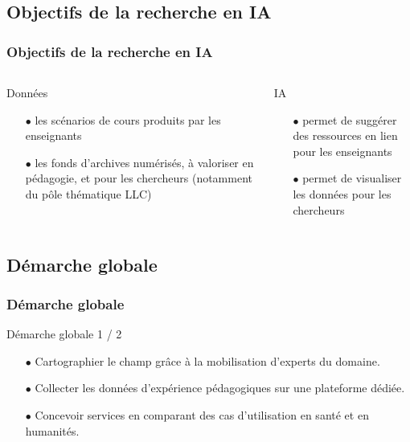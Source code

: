 \documentclass[xcolor=dvipsnames]{beamer}
\begin{document}
\subsection{Objectifs de la recherche en IA
}
\begin{frame}[fragile]
\frametitle{Objectifs de la recherche en IA
}
\begin{columns}
	\begin{block}{Données}
		\begin{itemize}
			\item[$\bullet$] les scénarios de cours produits par les enseignants
			\item[$\bullet$] les fonds d’archives numérisés, à valoriser en pédagogie, et pour les chercheurs (notamment du pôle thématique LLC)
		\end{itemize}	
	\end{block}
	\begin{block}{IA}
		\begin{itemize}
		\item[$\bullet$] permet de suggérer des ressources en lien pour les enseignants
		\item[$\bullet$] permet de visualiser les données pour les chercheurs
		\end{itemize}
	\end{block}
\end{columns}
\end{frame}

\subsection{Démarche globale}
\begin{frame}[fragile]
\frametitle{Démarche globale
}
\begin{block}{Démarche globale 1 / 2}
	\begin{itemize}
		\item[$\bullet$] Cartographier le champ grâce à la mobilisation d’experts du domaine.
		\item[$\bullet$] Collecter les données d’expérience pédagogiques sur une plateforme dédiée.
		\item[$\bullet$] Concevoir services en comparant des cas d'utilisation en santé et en humanités.
	\end{itemize}
\end{block}
\end{frame}
\end{document}
